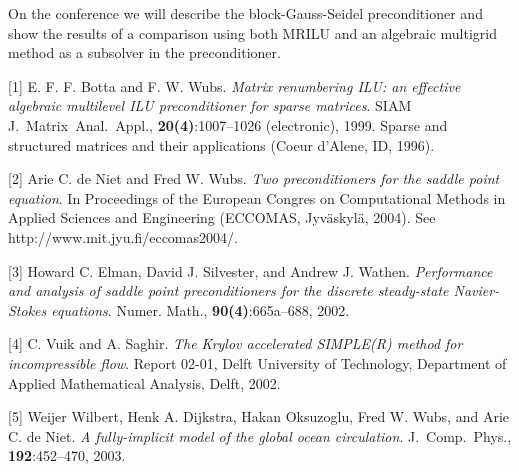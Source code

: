 \documentclass{report}
\begin{document}
On the conference we will describe the block-Gauss-Seidel
preconditioner and show the results of a comparison using both MRILU
and an algebraic multigrid method as a subsolver in the preconditioner.

[1]
E. F. F. Botta and F. W. Wubs.
{\em Matrix renumbering ILU: an effective algebraic multilevel ILU
preconditioner for sparse matrices}.
SIAM J.~Matrix~Anal.~Appl., {\bf 20(4)}:1007--1026 (electronic),
1999.
Sparse and structured matrices and their applications
(Coeur d'Alene, ID, 1996).

[2]
Arie C. de Niet and Fred W. Wubs.
{\em Two preconditioners for the saddle point
equation}.
In Proceedings of the European Congres on
Computational Methods in Applied Sciences
and Engineering (ECCOMAS,
Jyv\"{a}skyl\"{a}, 2004).
See http://www.mit.jyu.fi/eccomas2004/.

[3]
Howard C. Elman, David J.
Silvester, and Andrew J. Wathen.
{\em Performance and analysis of
saddle point preconditioners
for the discrete steady-state
Navier-Stokes equations}.
Numer. Math., {\bf 90(4)}:665a--688, 2002.

[4]
C. Vuik and A. Saghir.
{\em The Krylov accelerated SIMPLE(R) method for incompressible flow}.
Report 02-01, Delft University of Technology, Department of Applied
Mathematical Analysis, Delft, 2002.

[5]
Weijer Wilbert, Henk A.  Dijkstra, Hakan Oksuzoglu, Fred W.  Wubs, and
Arie C. de Niet.
{\em A fully-implicit model of the global ocean circulation}.
J.~Comp.~Phys., {\bf 192}:452--470, 2003.
\end{document}
